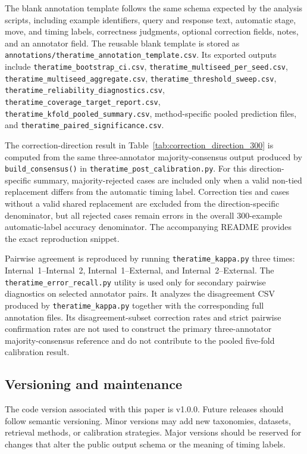 \documentclass[preprint,12pt,a4paper]{elsarticle}
\begin{document}
The blank annotation template follows the same schema expected by the analysis scripts, including example identifiers, query and response text, automatic stage, move, and timing labels, correctness judgments, optional correction fields, notes, and an annotator field. The reusable blank template is stored as \texttt{annotations/theratime\_annotation\_template.csv}. Its exported outputs include
\texttt{theratime\_bootstrap\_ci.csv},
\texttt{theratime\_multiseed\_per\_seed.csv},
\texttt{theratime\_multiseed\_aggregate.csv},
\texttt{theratime\_threshold\_sweep.csv},
\texttt{theratime\_reliability\_diagnostics.csv},
\texttt{theratime\_coverage\_target\_report.csv},
\texttt{theratime\_kfold\_pooled\_summary.csv},
method-specific pooled prediction files, and
\texttt{theratime\_paired\_significance.csv}.

The correction-direction result in Table~\ref{tab:correction_direction_300}
is computed from the same three-annotator majority-consensus output produced
by \texttt{build\_consensus()} in
\texttt{theratime\_post\_calibration.py}. For this direction-specific
summary, majority-rejected cases are included only when a valid non-tied
replacement differs from the automatic timing label. Correction ties and
cases without a valid shared replacement are excluded from the
direction-specific denominator, but all rejected cases remain errors in the
overall 300-example automatic-label accuracy denominator. The accompanying
README provides the exact reproduction snippet.

Pairwise agreement is reproduced by running
\texttt{theratime\_kappa.py} three times: Internal~1--Internal~2,
Internal~1--External, and Internal~2--External. The \texttt{theratime\_error\_recall.py} utility is used only for secondary
pairwise diagnostics on selected annotator pairs. It analyzes the disagreement
CSV produced by \texttt{theratime\_kappa.py} together with the corresponding
full annotation files. Its disagreement-subset correction rates and strict
pairwise confirmation rates are not used to construct the primary
three-annotator majority-consensus reference and do not contribute to the
pooled five-fold calibration result.

\subsection{Versioning and maintenance}

The code version associated with this paper is v1.0.0. Future releases should follow semantic versioning. Minor versions may add new taxonomies, datasets, retrieval methods, or calibration strategies. Major versions should be reserved for changes that alter the public output schema or the meaning of timing labels.
\end{document}
